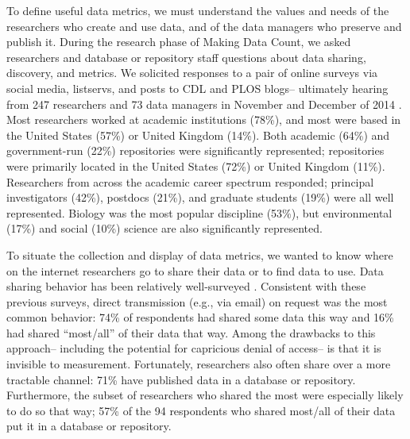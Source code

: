 \documentclass[english]{article}
\begin{document}

To define useful data metrics, we must understand the values and needs of the researchers who create and use data, and of the data managers who preserve and publish it.
During the research phase of Making Data Count, we asked researchers and database or repository staff questions about data sharing, discovery, and metrics.
We solicited responses to a pair of online surveys via social media, listservs, and posts to CDL and PLOS blogs-- ultimately hearing from 247 researchers and 73 data managers in November and December of 2014 \cite{kratz_making_2015}.
Most researchers worked at academic institutions (78\%), and most were based in the United States (57\%) or United Kingdom (14\%).
Both academic (64\%) and government-run (22\%) repositories were significantly represented; repositories were primarily located in the United States (72\%) or United Kingdom (11\%).
Researchers from across the academic career spectrum responded; principal investigators (42\%), postdocs (21\%), and graduate students (19\%) were all well represented. 
Biology was the most popular discipline (53\%), but environmental (17\%) and social (10\%) science are also significantly represented. 



To situate the collection and display of data metrics, we wanted to know where on the internet researchers go to share their data or to find data to use. 
Data sharing behavior has been relatively well-surveyed \cite{tenopir_data_2011, akers_disciplinary_2013, wallis_if_2013, aydinoglu_data_2014, kratz_researcher_2015}. 
Consistent with these previous surveys, direct transmission (e.g., via email) on request was the most common behavior: 74\% of respondents had shared some data this way and 16\% had shared ``most/all'' of their data that way.
Among the drawbacks to this approach-- including the potential for capricious denial of access-- is that it is invisible to measurement. 
Fortunately, researchers also often share over a more tractable channel: 71\% have published data in a database or repository.
Furthermore, the subset of researchers who shared the most were especially likely to do so that way; 57\% of the 94 respondents who shared most/all of their data put it in a database or repository.
\end{document}
